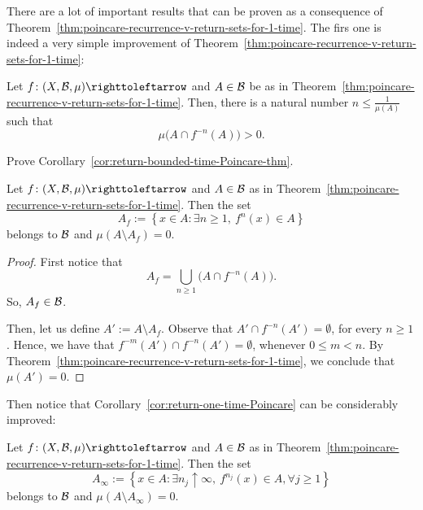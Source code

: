 There are a lot of important results that can be proven as a consequence of Theorem~\ref{thm:poincare-recurrence-v-return-sets-for-1-time}. The firs one is indeed a very simple improvement of Theorem~\ref{thm:poincare-recurrence-v-return-sets-for-1-time}:

\begin{corollary}\label{cor:return-bounded-time-Poincare-thm}
  Let $f\colon(X,\mc{B},\mu)\carr$ and $A\in\mathcal{B}$ be as in Theorem~\ref{thm:poincare-recurrence-v-return-sets-for-1-time}. Then, there is a natural number $n\leq \frac{1}{\mu(A)}$ such that
  \begin{displaymath}
    \mu\big(A\cap f^{-n}(A)\big)>0.
  \end{displaymath}
\end{corollary}

\begin{exercise}
  Prove Corollary~\ref{cor:return-bounded-time-Poincare-thm}.
\end{exercise}


\begin{corollary}\label{cor:return-one-time-Poincare}
  Let $f\colon (X,\mc{B},\mu)\carr$ and $A\in\mathcal{B}$ as in Theorem~\ref{thm:poincare-recurrence-v-return-sets-for-1-time}. Then the set
  \begin{displaymath}
    A_{f}:=\left\{x\in A : \exists n\geq 1,\ f^{n}(x)\in A\right\}
  \end{displaymath}
  belongs to $\mathcal{B}$ and $\mu(A\setminus A_{f})=0$.
\end{corollary}

\begin{proof}
  First notice that
  \begin{displaymath}
    A_{f}=\bigcup_{n\geq 1} \big(A\cap f^{-n}(A)\big).
  \end{displaymath}
  So, $A_{f}\in\mathcal{B}$.

  Then, let us define $A':=A\setminus A_{f}$. Observe that $A'\cap f^{-n}(A')=\emptyset$, for every $n\geq 1$. Hence, we have that $f^{-m}(A')\cap f^{-n}(A')=\emptyset$, whenever $0\leq m<n$. By Theorem~\ref{thm:poincare-recurrence-v-return-sets-for-1-time}, we conclude that $\mu(A')=0$.
\end{proof}

Then notice that Corollary~\ref{cor:return-one-time-Poincare} can be considerably improved:

\begin{corollary}\label{cor:return-infinitely-many-times-Poincare}
  Let $f\colon (X,\mc{B},\mu)\carr$ and $A\in\mathcal{B}$ as in Theorem~\ref{thm:poincare-recurrence-v-return-sets-for-1-time}. Then the set
  \begin{displaymath}
    A_{\infty}:=\left\{x\in A : \exists n_{j}\uparrow\infty,\ f^{n_{j}}(x)\in A, \forall j\geq 1\right\}
  \end{displaymath}
  belongs to $\mathcal{B}$ and $\mu(A\setminus A_{\infty})=0$.
\end{corollary}

